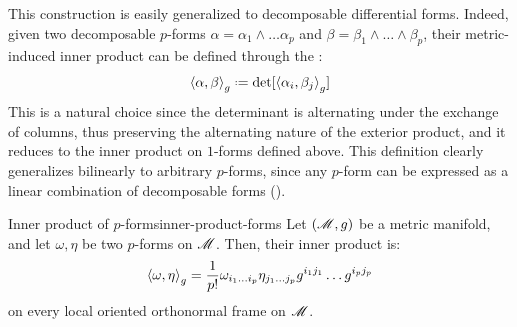 This construction is easily generalized to decomposable differential forms. Indeed, given two decomposable $ p $-forms $ \alpha = \alpha_1 \wedge \dots \alpha_p $ and $ \beta = \beta_1 \wedge \dots \wedge \beta_p $, their metric-induced inner product can be defined through the :
\begin{equation}
  \braket{\alpha , \beta}_g \defeq \det [\braket{\alpha_i , \beta_j}_g]
  \label{eq:gram-determinant}
\end{equation}
This is a natural choice since the determinant is alternating under the exchange of columns, thus preserving the alternating nature of the exterior product, and it reduces to the inner product on $ 1 $-forms defined above. This definition clearly generalizes bilinearly to arbitrary $ p $-forms, since any $ p $-form can be expressed as a linear combination of decomposable forms ().

\begin{proposition}{Inner product of $ p $-forms}{inner-product-forms}
  Let $ (\mathscr{M},g) $ be a metric manifold, and let $ \omega , \eta $ be two $ p $-forms on $ \mathscr{M} $. Then, their inner product is:
  \begin{equation}
    \braket{\omega , \eta}_g = \frac{1}{p!} \omega_{i_1 \dots i_p} \eta_{j_1 \dots j_p} g^{i_1 j_1} \dots g^{i_p j_p}
  \end{equation}
  on every local oriented orthonormal frame on $ \mathscr{M} $.
\end{proposition}

